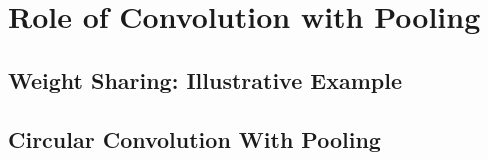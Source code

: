 \section{Role of Convolution with Pooling}

\subsection{Weight Sharing: Illustrative Example}
\FloatBarrier
\begin{figure}[H]
\centering
{}
\end{figure}

\subsection{Circular Convolution With Pooling}

